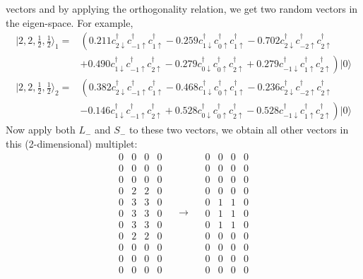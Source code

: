 vectors and by applying the orthogonality relation, we get two random vectors
in the eigen-space. For example,
\begin{align}
|2,2,\frac{1}{2},\frac{1}{2}\rangle_1 = {} & \left( 0.211c_{2\downarrow}^\dagger c_{-1\uparrow}^\dagger c_{1\uparrow}^\dagger -0.259c_{1\downarrow}^\dagger c_{0\uparrow}^\dagger c_{1\uparrow}^\dagger -0.702c_{2\downarrow}^\dagger c_{-2\uparrow}^\dagger c_{2\uparrow}^\dagger \right. \nonumber \\
& \left. +0.490c_{1\downarrow}^\dagger c_{-1\uparrow}^\dagger c_{2\uparrow}^\dagger -0.279c_{0\downarrow}^\dagger c_{0\uparrow}^\dagger c_{2\uparrow}^\dagger +0.279c_{-1\downarrow}^\dagger c_{1\uparrow}^\dagger c_{2\uparrow}^\dagger \right)|0\rangle \label{eq:randv1} \\ 
|2,2,\frac{1}{2},\frac{1}{2}\rangle_2 = {} & \left( 0.382c_{2\downarrow}^\dagger c_{-1\uparrow}^\dagger c_{1\uparrow}^\dagger -0.468c_{1\downarrow}^\dagger c_{0\uparrow}^\dagger c_{1\uparrow}^\dagger -0.236c_{2\downarrow}^\dagger c_{-2\uparrow}^\dagger c_{2\uparrow}^\dagger \right. \nonumber \\
& \left. -0.146c_{1\downarrow}^\dagger c_{-1\uparrow}^\dagger c_{2\uparrow}^\dagger +0.528c_{0\downarrow}^\dagger c_{0\uparrow}^\dagger c_{2\uparrow}^\dagger -0.528c_{-1\downarrow}^\dagger c_{1\uparrow}^\dagger c_{2\uparrow}^\dagger \right)|0\rangle \label{eq:randv2}
\end{align}
%
Now apply both $L_-$ and $S_-$ to these two vectors, we obtain all other
vectors in this (2-dimensional) multiplet:
\begin{equation*}
\begin{matrix}
0 & 0 & 0 & 0 \\ 
0 & 0 & 0 & 0 \\ 
0 & 0 & 0 & 0 \\ 
0 & \boxed{2} & \boxed{2} & 0 \\ 
0 & \boxed{3} & \boxed{3} & 0 \\ 
0 & \boxed{3} & \boxed{3} & 0 \\ 
0 & \boxed{3} & \boxed{3} & 0 \\ 
0 & \boxed{2} & \boxed{2} & 0 \\ 
0 & 0 & 0 & 0 \\ 
0 & 0 & 0 & 0 \\ 
0 & 0 & 0 & 0
\end{matrix}
\quad \rightarrow \quad
\begin{matrix}
0 & 0 & 0 & 0 \\ 
0 & 0 & 0 & 0 \\ 
0 & 0 & 0 & 0 \\ 
0 & 0 & 0 & 0 \\ 
0 & 1 & 1 & 0 \\ 
0 & 1 & 1 & 0 \\ 
0 & 1 & 1 & 0 \\ 
0 & 0 & 0 & 0 \\ 
0 & 0 & 0 & 0 \\ 
0 & 0 & 0 & 0 \\ 
0 & 0 & 0 & 0
\end{matrix}
\end{equation*}
